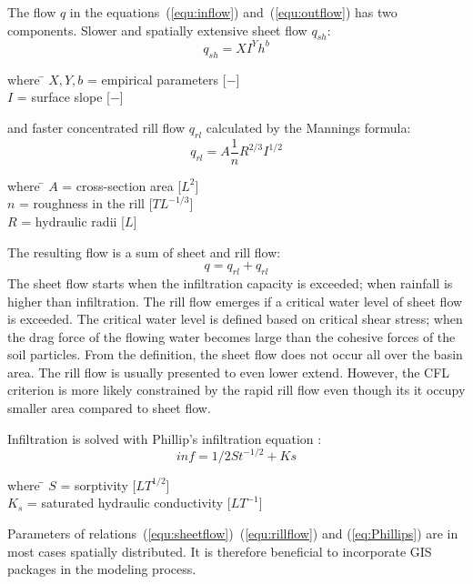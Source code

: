 The flow $q$ in the equations~(\ref{equ:inflow}) and~(\ref{equ:outflow})
has two components. Slower and spatially extensive sheet flow
$q_{sh}$:
\begin{equation}\label{equ:sheetflow}
    q_{sh} = XI^Yh^b
\end{equation}
\begin{tabbing} 
where \hspace{0.6cm} \= $X,Y,b$ = empirical parameters [$-$]\\
\> $I$ = surface slope [$-$]
\end{tabbing}
and faster concentrated rill flow $q_{rl}$ calculated by the Mannings formula:
\begin{equation}\label{equ:rillflow}
    q_{rl} = A\frac{1}{n} R^{2/3} I^{1/2}
\end{equation}
\begin{tabbing} 
where \hspace{0.6cm} \= $A$ = cross-section area [$L^2$]\\
\> $n$ = roughness in the rill [$TL^{-1/3}$]\\
\> $R$ = hydraulic radii [$L$]
\end{tabbing}
The resulting flow is a sum of sheet and rill flow:
\begin{equation}\label{equ:flow}
    q = q_{rl} + q_{rl}
\end{equation}
The sheet flow starts when the infiltration capacity is exceeded; 
when rainfall is higher than infiltration. The rill flow emerges if 
a critical water level of sheet flow is exceeded. The critical 
water level is defined based on critical shear stress; when the 
drag force of the flowing water becomes large than the cohesive 
forces of the soil particles.
From the definition, the sheet flow does not occur all over the 
basin area. The rill flow is usually presented to even lower extend. 
However, the CFL criterion is more likely constrained by the 
rapid rill flow even though its it occupy smaller area compared to sheet flow. 

Infiltration is solved with Phillip's infiltration equation \cite{philip1957theory}:
\begin{equation}\label{eq:Phillips}
    inf = 1/2St^{-1/2} + Ks
\end{equation}
\begin{tabbing} 
where \hspace{0.6cm} \= $S$ = sorptivity [$LT^{1/2}$]\\
\> $K_s$ = saturated hydraulic conductivity [$LT^{-1}$]
\end{tabbing}

Parameters of relations~(\ref{equ:sheetflow})~(\ref{equ:rillflow}) and
(\ref{eq:Phillips}) are in most cases spatially distributed. It is 
therefore beneficial to incorporate GIS packages in the modeling process. 



